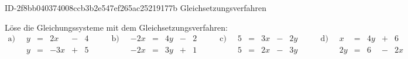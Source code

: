 \begin{exercise}
      {ID-2f8bb040374008ccb3b2e547ef265ac25219177b}
      {Gleichsetzungsverfahren}
  \ifproblem\problem\par
    Löse die Gleichungssysteme mit dem
    Gleichsetzungsverfahren:
    \begingroup
      \setlength{\arraycolsep}{2pt}
      \begin{equation*}
        \begin{array}{r|rcrcr}
          \text{a)}\;\; & y & = &  2x & - & 4 \\
                        & y & = & -3x & + & 5
        \end{array}
        \qquad
        \begin{array}{r|rcrcr}
          \text{b)}\;\; & -2x & = & 4y & - & 2 \\
                        & -2x & = & 3y & + & 1
        \end{array}
        \qquad
        \begin{array}{r|rcrcr}
          \text{c)}\;\; & 5 & = & 3x & - & 2y \\
                        & 5 & = & 2x & - & 3y
        \end{array}
        \qquad
        \begin{array}{r|rcrcr}
          \text{d)}\;\; &  x & = & 4y & + &  6 \\
                        & 2y & = &  6 & - & 2x
        \end{array}
      \end{equation*}
    \endgroup
  \fi
\end{exercise}
